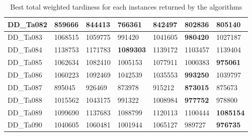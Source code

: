 \documentclass[runningheads]{llncs}
\begin{document}
\begin{table}[H]
\begin{tabular}{|l|l|l|l|l|l|l|}
  \hline
  DD\_Ta082 & 859666  & 844413  & \textbf{766361}        & 842497       & 802836         & 805140        \\
  \hline
  DD\_Ta083 & 1068515 & 1059775 & 991420        & 1041605      & \textbf{980420}         & 1027187       \\
  \hline
  DD\_Ta084 & 1138753 & 1171783 & \textbf{1089303}       & 1139172      & 1103457        & 1139404       \\
  \hline
  DD\_Ta085 & 1062634 & 1082410 & 1005153       & 1077911      & 1000383        & \textbf{975061}        \\
  \hline
  DD\_Ta086 & 1060223 & 1092469 & 1042539       & 1035553      & \textbf{993250}         & 1039797       \\
  \hline
  DD\_Ta087 & 895045  & 926469  & 873978        & 915212       & \textbf{873015}         & 875673        \\
  \hline
  DD\_Ta088 & 1015562 & 1043175 & 991322        & 1008984      & \textbf{977752}         & 978800        \\
  \hline
  DD\_Ta089 & 1099690 & 1137683 & 1088799       & 1120113      & 1100444        & \textbf{1085154}       \\
  \hline
  DD\_Ta090 & 1040605 & 1060481 & 1001944       & 1065127      & 989727         & \textbf{976735}        \\
  \hline
  \end{tabular}
  \caption{Best total weighted tardiness for each instances returned by the algorithms}
  \label{table:best}
\end{table}
\end{document}
